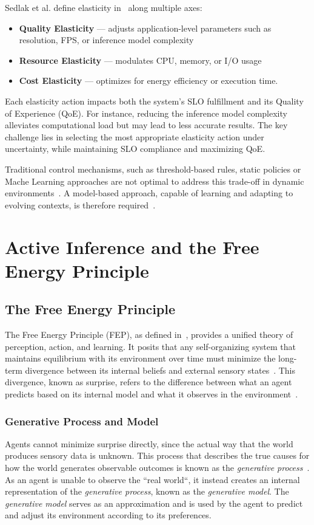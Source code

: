 Sedlak et al. define elasticity in~\cite{sedlak_towards_2025} along multiple axes:
\begin{itemize}
  \item \textbf{Quality Elasticity} — adjusts application-level parameters such as resolution, FPS,
or inference model complexity
  \item \textbf{Resource Elasticity} — modulates CPU, memory, or I/O usage
  \item \textbf{Cost Elasticity} — optimizes for energy efficiency or execution time.
\end{itemize}

Each elasticity action impacts both the system's SLO fulfillment and its Quality of Experience
(QoE). For instance, reducing the inference model complexity alleviates computational load but may lead to less accurate results. The key challenge lies in selecting the most appropriate elasticity action under uncertainty, while maintaining SLO compliance and maximizing QoE.

Traditional control mechanisms, such as threshold-based rules, static policies or Mache Learning approaches are not optimal to address this trade-off in dynamic environments~\cite{sedlak_active_2024}. A model-based approach, capable of learning and adapting to evolving contexts, is therefore required~\cite{sedlak_equilibrium_2024, danilenka_adaptive_2025}.

\section{Active Inference and the Free Energy Principle}
\subsection{The Free Energy Principle}
The Free Energy Principle (FEP), as defined in~\cite{friston_free-energy_2010}, provides a unified
theory of perception, action, and learning. It posits that any self-organizing system that
maintains equilibrium with its environment over time must minimize the long-term divergence between its
internal beliefs and external sensory states~\cite{friston_active_2017}. This divergence, known as
surprise, refers to the difference between what an agent predicts based on its internal model and what it observes in the environment~\cite{sedlak_adaptive_2024}.

\subsubsection{Generative Process and Model}
Agents cannot minimize surprise directly, since the actual way that the world produces sensory data
is unknown. This process that describes the true causes for how the world generates observable
outcomes is known as the \textit{generative process}~\cite{friston_free-energy_2010, smith_step-by-step_2022}. As an agent is unable to observe the ``real world``, it instead creates an internal representation of the \textit{generative process}, known as the \textit{generative model}. The \textit{generative model} serves as an approximation and is used by the agent to predict and adjust its environment according to its preferences.

